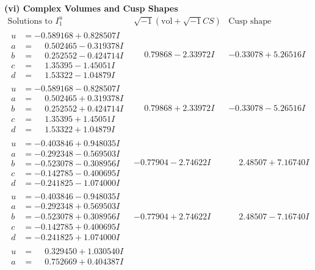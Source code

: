 \documentclass[1p]{elsarticle_modified}
\theoremstyle{definition}
\newcommand{\I}{\sqrt{-1}}
\begin{document}
\newpage\flushleft \textbf{(vi) Complex Volumes and Cusp Shapes}
$$\begin{array}{c|c|c}  
\text{Solutions to }I^u_{1}& \I (\text{vol} + \sqrt{-1}CS) & \text{Cusp shape}\\
 \hline 
\begin{aligned}
u &= -0.589168 + 0.828507 I \\
a &= \phantom{-}0.502465 - 0.319378 I \\
b &= \phantom{-}0.252552 - 0.424714 I \\
c &= \phantom{-}1.35395 - 1.45051 I \\
d &= \phantom{-}1.53322 - 1.04879 I\end{aligned}
 & \phantom{-}0.79868 - 2.33972 I & -0.33078 + 5.26516 I \\ \hline\begin{aligned}
u &= -0.589168 - 0.828507 I \\
a &= \phantom{-}0.502465 + 0.319378 I \\
b &= \phantom{-}0.252552 + 0.424714 I \\
c &= \phantom{-}1.35395 + 1.45051 I \\
d &= \phantom{-}1.53322 + 1.04879 I\end{aligned}
 & \phantom{-}0.79868 + 2.33972 I & -0.33078 - 5.26516 I \\ \hline\begin{aligned}
u &= -0.403846 + 0.948035 I \\
a &= -0.292348 - 0.569503 I \\
b &= -0.523078 - 0.308956 I \\
c &= -0.142785 - 0.400695 I \\
d &= -0.241825 - 1.074000 I\end{aligned}
 & -0.77904 - 2.74622 I & \phantom{-}2.48507 + 7.16740 I \\ \hline\begin{aligned}
u &= -0.403846 - 0.948035 I \\
a &= -0.292348 + 0.569503 I \\
b &= -0.523078 + 0.308956 I \\
c &= -0.142785 + 0.400695 I \\
d &= -0.241825 + 1.074000 I\end{aligned}
 & -0.77904 + 2.74622 I & \phantom{-}2.48507 - 7.16740 I \\ \hline\begin{aligned}
u &= \phantom{-}0.329450 + 1.030540 I \\
a &= \phantom{-}0.752669 + 0.404387 I \\

\end{aligned}
\end{array}$$
\end{document}
